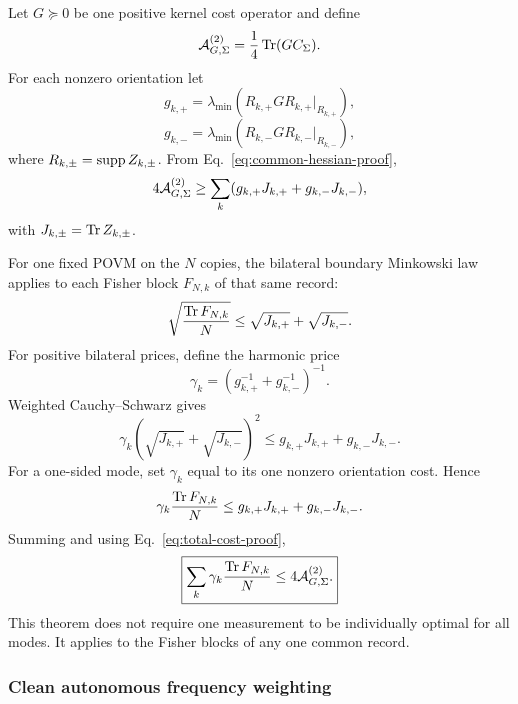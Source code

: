 Let $G\succeq0$ be one positive kernel cost operator and define
\begin{equation}
\mathcal A_{G,\Sigma}^{(2)}
=\frac14\operatorname{Tr}(GC_\Sigma).
\end{equation}
For each nonzero orientation let
\begin{equation}
g_{k,+}
=\lambda_{\min}
(R_{k,+}GR_{k,+}|_{R_{k,+}}),
\end{equation}
\begin{equation}
g_{k,-}
=\lambda_{\min}
(R_{k,-}GR_{k,-}|_{R_{k,-}}),
\end{equation}
where $R_{k,\pm}=\operatorname{supp} Z_{k,\pm}$. From Eq.~\eqref{eq:common-hessian-proof},
\begin{equation}
4\mathcal A_{G,\Sigma}^{(2)}
\ge
\sum_k(g_{k,+}J_{k,+}+g_{k,-}J_{k,-}),
\label{eq:total-cost-proof}
\end{equation}
with $J_{k,\pm}=\operatorname{Tr} Z_{k,\pm}$.

For one fixed POVM on the $N$ copies, the bilateral boundary Minkowski law applies to each Fisher block $F_{N,k}$ of that same record:
\begin{equation}
\sqrt{\frac{\operatorname{Tr} F_{N,k}}{N}}
\le
\sqrt{J_{k,+}}+\sqrt{J_{k,-}}.
\end{equation}
For positive bilateral prices, define the harmonic price
\begin{equation}
\gamma_k
=\left(g_{k,+}^{-1}+g_{k,-}^{-1}\right)^{-1}.
\end{equation}
Weighted Cauchy--Schwarz gives
\begin{equation}
\gamma_k
(\sqrt{J_{k,+}}+\sqrt{J_{k,-}})^2
\le
g_{k,+}J_{k,+}+g_{k,-}J_{k,-}.
\end{equation}
For a one-sided mode, set $\gamma_k$ equal to its one nonzero orientation cost. Hence
\begin{equation}
\gamma_k\frac{\operatorname{Tr} F_{N,k}}{N}
\le
g_{k,+}J_{k,+}+g_{k,-}J_{k,-}.
\end{equation}
Summing and using Eq.~\eqref{eq:total-cost-proof},
\begin{equation}
\boxed{
\sum_k\gamma_k\frac{\operatorname{Tr} F_{N,k}}{N}
\le4\mathcal A_{G,\Sigma}^{(2)}.
}
\label{eq:multigap-proof-final}
\end{equation}
This theorem does not require one measurement to be individually optimal for all modes. It applies to the Fisher blocks of any one common record.

\subsubsection{Clean autonomous frequency weighting}


